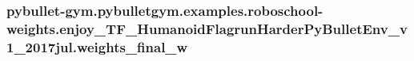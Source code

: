 \subsubsection[{\texorpdfstring{weights\+\_\+final\+\_\+w}{weights_final_w}}]{\setlength{\rightskip}{0pt plus 5cm}pybullet-\/gym.\+pybulletgym.\+examples.\+roboschool-\/weights.\+enjoy\+\_\+\+T\+F\+\_\+\+Humanoid\+Flagrun\+Harder\+Py\+Bullet\+Env\+\_\+v1\+\_\+2017jul.\+weights\+\_\+final\+\_\+w}\hypertarget{namespacepybullet-gym_1_1pybulletgym_1_1examples_1_1roboschool-weights_1_1enjoy___t_f___humanoid9dba9dbbc727c9140c0c88eec28e43d0_a6fab2296659039feb5a2a0417c56e010}{}\label{namespacepybullet-gym_1_1pybulletgym_1_1examples_1_1roboschool-weights_1_1enjoy___t_f___humanoid9dba9dbbc727c9140c0c88eec28e43d0_a6fab2296659039feb5a2a0417c56e010}
